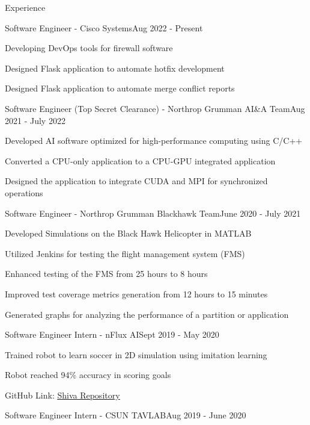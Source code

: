 \documentclass{resume}
\begin{document}
\begin{rSection}{Experience}
    \begin{rSubsection}{Software Engineer - Cisco Systems}{Aug 2022 - Present}
        \item Developing DevOps tools for firewall software
        \item Designed Flask application to automate hotfix development
        \item Designed Flask application to automate merge conflict reports
    \end{rSubsection}
    \begin{rSubsection}{Software Engineer (Top Secret Clearance) - Northrop Grumman AI\&A Team}{Aug 2021 - July 2022}
        \item Developed AI software optimized for high-performance computing using C/C++
        \item Converted a CPU-only application to a CPU-GPU integrated application
        \item Designed the application to integrate CUDA and MPI for synchronized operations
    \end{rSubsection}
    \begin{rSubsection}{Software Engineer - Northrop Grumman Blackhawk Team}{June 2020 - July 2021}
        \item Developed Simulations on the Black Hawk Helicopter in MATLAB
        \item Utilized Jenkins for testing the flight management system (FMS)
        \item Enhanced testing of the FMS from 25 hours to 8 hours
        \item Improved test coverage metrics generation from 12 hours to 15 minutes
        \item Generated graphs for analyzing the performance of a partition or application
    \end{rSubsection}
    \begin{rSubsection}{Software Engineer Intern - nFlux AI}{Sept 2019 - May 2020}
        \item Trained robot to learn soccer in 2D simulation using imitation learning
        \item Robot reached 94\% accuracy in scoring goals
        \item GitHub Link: \href{https://github.com/nflux/Shiva}{\color{blue}\underline{Shiva Repository}}
    \end{rSubsection}
    \begin{rSubsection}{Software Engineer Intern - CSUN TAVLAB}{Aug 2019 - June 2020}

\end{rSubsection}
\end{rSection}
\end{document}
